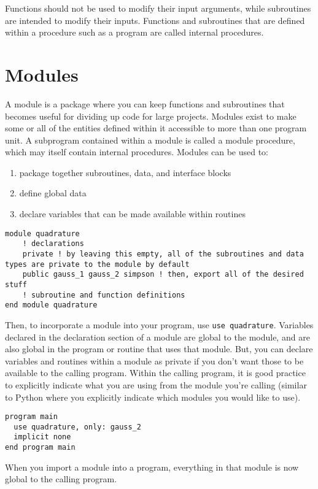 \documentclass[10pt]{article}
\begin{document}
Functions should not be used to modify their input arguments, while subroutines are intended to modify their inputs. Functions and subroutines that are defined within a procedure such as a program are called internal procedures.

\section{Modules}
A module is a package where you can keep functions and subroutines that becomes useful for dividing up code for large projects. Modules exist to make some or all of the entities defined within it accessible to more than one program unit. A subprogram contained within a module is called a module procedure, which may itself contain internal procedures. Modules can be used to:

\begin{enumerate}
\item package together subroutines, data, and interface blocks
\item define global data
\item declare variables that can be made available within routines
\end{enumerate}

\begin{lstlisting}
module quadrature
 	! declarations
	private ! by leaving this empty, all of the subroutines and data types are private to the module by default
	public gauss_1 gauss_2 simpson ! then, export all of the desired stuff
	! subroutine and function definitions
end module quadrature
\end{lstlisting}

Then, to incorporate a module into your program, use {\tt use quadrature}. Variables declared in the declaration section of a module are global to the module, and are also global in the program or routine that uses that module. But, you can declare variables and routines within a module as private if you don't want those to be available to the calling program. Within the calling program, it is good practice to explicitly indicate what you are using from the module you're calling (similar to Python where you explicitly indicate which modules you would like to use). 

\begin{lstlisting}
program main
  use quadrature, only: gauss_2
  implicit none
end program main
\end{lstlisting}

When you import a module into a program, everything in that module is now global to the calling program. 
\end{document}
